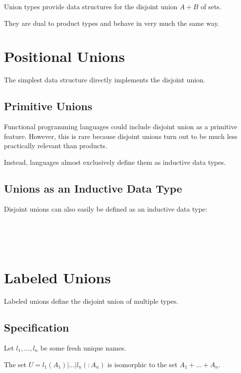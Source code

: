 Union types provide data structures for the disjoint union $A+B$ of sets.

They are dual to product types and behave in very much the same way.

\section{Positional Unions}

The simplest data structure directly implements the disjoint union.

\subsection{Primitive Unions}

Functional programming languages could include disjoint union as a primitive feature.
However, this is rare because disjoint unions turn out to be much less practically relevant than products.

Instead, languages almost exclusively define them as inductive data types.

\subsection{Unions as an Inductive Data Type}

Disjoint unions can also easily be defined as an inductive data type:
\begin{acode}
\\
\\
\\
\end{acode}

\section{Labeled Unions}

Labeled unions define the disjoint union of multiple types.

\subsection{Specification}

Let $l_1,\ldots,l_n$ be some fresh unique names.

The set $U=l_1(A_1)|\ldots|l_n(:A_n)$ is isomorphic to the set $A_1+ \ldots +A_n$.

